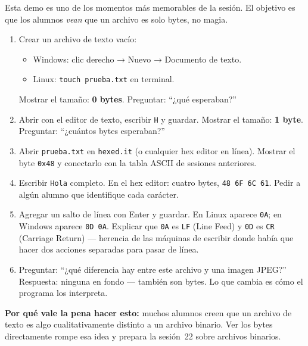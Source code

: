 \documentclass[12pt, oneside]{article}
\begin{document}
\begin{notaprofesor}
  Esta demo es uno de los momentos más memorables de la sesión.  El objetivo
  es que los alumnos \textit{vean} que un archivo es solo bytes, no magia.

  \begin{enumerate}
    \item Crear un archivo de texto vacío:
          \begin{itemize}
            \item Windows: clic derecho → Nuevo → Documento de texto.
            \item Linux: \texttt{touch prueba.txt} en terminal.
          \end{itemize}
          Mostrar el tamaño: \textbf{0 bytes}.  Preguntar: ``¿qué esperaban?''

    \item Abrir con el editor de texto, escribir \texttt{H} y guardar.
          Mostrar el tamaño: \textbf{1 byte}.  Preguntar: ``¿cuántos bytes
          esperaban?''

    \item Abrir \texttt{prueba.txt} en \texttt{hexed.it} (o cualquier hex
          editor en línea).  Mostrar el byte \texttt{0x48} y conectarlo con
          la tabla ASCII de sesiones anteriores.

    \item Escribir \texttt{Hola} completo.  En el hex editor: cuatro bytes,
          \texttt{48 6F 6C 61}.  Pedir a algún alumno que identifique cada
          carácter.

    \item Agregar un salto de línea con Enter y guardar.  En Linux aparece
          \texttt{0A}; en Windows aparece \texttt{0D 0A}.  Explicar que
          \texttt{0A} es \texttt{LF} (Line Feed) y \texttt{0D} es
          \texttt{CR} (Carriage Return) — herencia de las máquinas de escribir
          donde había que hacer dos acciones separadas para pasar de línea.

    \item Preguntar: ``¿qué diferencia hay entre este archivo y una imagen
          JPEG?''  Respuesta: ninguna en fondo — también son bytes.  Lo que
          cambia es cómo el programa los interpreta.
  \end{enumerate}

  \textbf{Por qué vale la pena hacer esto:} muchos alumnos creen que un
  archivo de texto es algo cualitativamente distinto a un archivo binario.
  Ver los bytes directamente rompe esa idea y prepara la sesión~22 sobre
  archivos binarios.
\end{notaprofesor}
\end{document}
